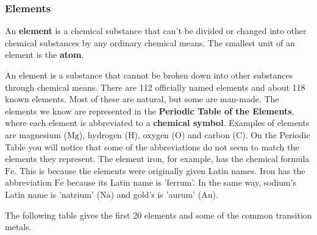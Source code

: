             \subsubsection{ Elements}
            \nopagebreak
        \label{m38708*id63302}An \textbf{element} is a chemical substance that can't be divided or changed into other chemical substances by any ordinary chemical means. The smallest unit of an element is the \textbf{atom}.\par 
\label{m38708*fhsst!!!underscore!!!id193}
{ \label{m38708*meaningfhsst!!!underscore!!!id193}
An element is a substance that cannot be broken down into other substances through chemical means.} 
        \label{m38708*id63334}There are 112 officially named elements and about 118 known elements. Most of these are natural, but some are man-made. The elements we know are represented in the \textbf{Periodic Table of the Elements}, where each element is abbreviated to a \textbf{chemical symbol}. Examples of elements are magnesium ($\mathrm{Mg}$), hydrogen ($\mathrm{H}$), oxygen ($\mathrm{O}$) and carbon ($\mathrm{C}$). On the Periodic Table you will notice that some of the abbreviations do not seem to match the elements they represent. The element iron, for example, has the chemical formula $\mathrm{Fe}$. This is because the elements were originally given Latin names. Iron has the abbreviation $\mathrm{Fe}$ because its Latin name is 'ferrum'. In the same way, sodium's Latin name is 'natrium' ($\mathrm{Na}$) and gold's is 'aurum' ($\mathrm{Au}$).\par \label{m38708*eip-775}
The following table gives the first 20 elements and some of the common transition metals.\par

